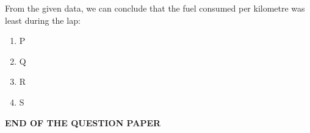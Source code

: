 \documentclass[journal,12pt,onecolumn]{IEEEtran}
\theoremstyle{remark}
\begin{document}
\begin{enumerate}
 
From the given data, we can conclude that the fuel consumed per kilometre was least during the lap:

\begin{multicols}{2}
\begin{enumerate}
    \item P
    \item Q
    \item R
    \item S
\end{enumerate}
\end{multicols}

 

\centerline{\textbf{END OF THE QUESTION PAPER}}


\end{enumerate}
\end{document}
